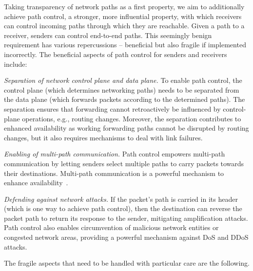 \documentclass[a4paper]{llncs}
\begin{document}
Taking transparency of network paths as a first property, we aim to
additionally achieve path control, a stronger, more influential property, with
which receivers can control incoming paths through which they are reachable.
Given a path to a receiver, senders can control end-to-end paths.
This seemingly benign requirement has various repercussions --
beneficial but also fragile if implemented incorrectly. The beneficial
aspects of path control for senders and receivers include:
\begin{compactitem}

  \item \emph{Separation of network control plane and data plane.}
  To enable path control, the control plane (which determines
  networking paths) needs to be separated from the data plane (which
  forwards packets according to the determined paths). The separation
  ensures that forwarding cannot retroactively be influenced by
  control-plane operations, e.g., routing changes. Moreover, the
  separation contributes to enhanced availability as working
  forwarding paths cannot be disrupted by routing changes, but it
  also requires mechanisms to deal with link failures.

  \item \emph{Enabling of multi-path communication.} 
  Path control empowers multi-path communication by letting senders
  select multiple paths to carry packets towards their destinations.
  Multi-path communication is a powerful mechanism to enhance
  availability~\cite{AnBaKaMo2001}.

  \item \emph{Defending against network attacks.}
  If the packet's path is carried in its header (which
  is one way to achieve path control), then the destination can reverse the
  packet path to return its response to the sender, mitigating amplification
  attacks. Path control also enables circumvention of malicious network entities
  or congested network areas, providing a powerful mechanism against DoS and
  DDoS attacks.

\end{compactitem}
\smallskip
The fragile aspects that need to be handled with particular care are
the following.
\end{document}
